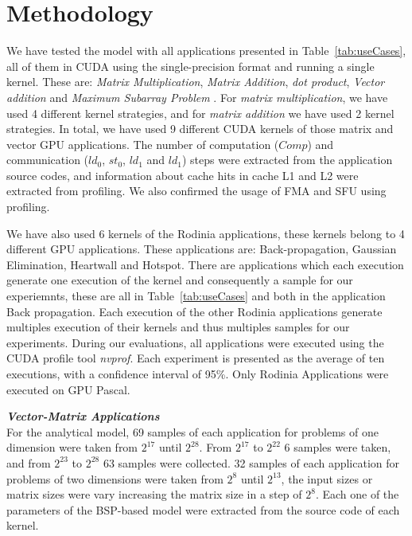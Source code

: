 \section{Methodology}\label{sec:methodModel}
We have tested the model with all applications presented in Table~\ref{tab:useCases}, all of them in CUDA using the single-precision format and running a single kernel. These are: \emph{Matrix Multiplication}, \emph{Matrix Addition}, \emph{dot product}, \emph{Vector addition} and \emph{Maximum Subarray Problem} \citep{Cleber:Thesis}. For \emph{matrix multiplication}, we have used 4 different kernel strategies, and for \emph{matrix addition} we have used 2 kernel strategies. In total, we have used 9 different CUDA kernels of those matrix and vector GPU applications. The number of computation ($Comp$) and communication ($ld_0$, $st_0$, $ld_1$ and $ld_1$) steps were extracted from the application source codes, and information about cache hits in cache L1 and L2 were extracted from profiling. We also confirmed the usage of FMA and SFU using profiling. 

We have also used 6 kernels of the Rodinia applications, these kernels belong to 4 different GPU applications. These applications are: Back-propagation, Gaussian Elimination, Heartwall and Hotspot. There are applications which each execution generate one execution of the kernel and consequently a sample for our experiemnts, these are all in Table~\ref{tab:useCases} and both in the application Back propagation. Each execution of the other Rodinia applications generate multiples execution of their kernels and thus multiples samples for our experiments. During our evaluations, all applications were executed using the CUDA profile tool \textit{nvprof}. Each experiment is presented as the average of ten executions, with a confidence interval of 95\%. Only Rodinia Applications were executed on GPU Pascal. 


\textbf{\emph{Vector-Matrix Applications}}\\


For the analytical model, 69 samples of each application for problems of one dimension were taken from $2^{17}$ until $2^{28}$. From $2^{17}$ to $2^{22}$ 6 samples were taken, and from $2^{23}$ to $2^{28}$ 63 samples were collected. 32 samples of each application for problems of two dimensions were taken from $2^8$ until $2^{13}$, the input sizes or matrix sizes were vary increasing the matrix size in a step of $2^8$. Each one of the parameters of the BSP-based model were extracted from the source code of each kernel.  

